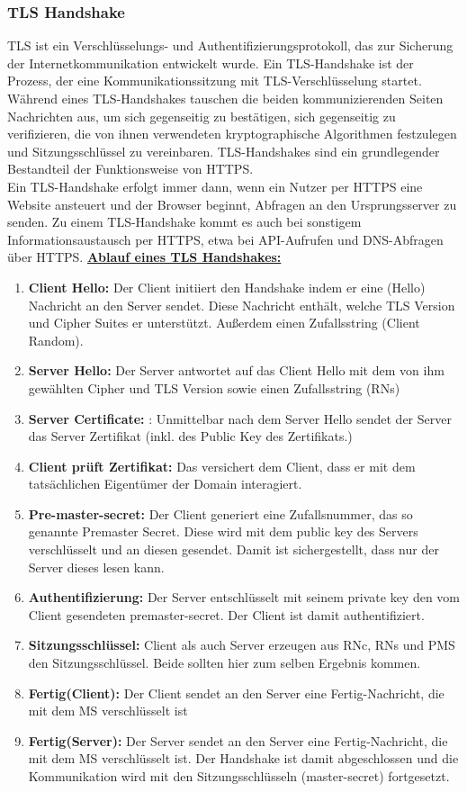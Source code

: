 \documentclass[12pt,a4paper]{article}
\begin{document}
\subsubsection{TLS Handshake}
TLS ist ein Verschlüsselungs- und Authentifizierungsprotokoll, das zur Sicherung der Internetkommunikation entwickelt wurde. Ein TLS-Handshake ist der Prozess, der eine Kommunikationssitzung mit TLS-Verschlüsselung startet. Während eines TLS-Handshakes tauschen die beiden kommunizierenden Seiten Nachrichten aus, um sich gegenseitig zu bestätigen, sich gegenseitig zu verifizieren, die von ihnen verwendeten kryptographische Algorithmen festzulegen und Sitzungsschlüssel zu vereinbaren. TLS-Handshakes sind ein grundlegender Bestandteil der Funktionsweise von HTTPS.\\
Ein TLS-Handshake erfolgt immer dann, wenn ein Nutzer per HTTPS eine Website ansteuert und der Browser beginnt, Abfragen an den Ursprungsserver zu senden. Zu einem TLS-Handshake kommt es auch bei sonstigem Informationsaustausch per HTTPS, etwa bei API-Aufrufen und DNS-Abfragen über HTTPS.\newpage
\textbf{\underline{Ablauf eines TLS Handshakes:}}
\begin{enumerate}
	\item \textbf{Client Hello:}  Der Client initiiert den Handshake indem er eine (Hello) Nachricht an den Server sendet. Diese Nachricht enthält, welche TLS Version und Cipher Suites er unterstützt. Außerdem einen Zufallsstring (Client Random).
	\item \textbf{Server Hello:} Der Server antwortet auf das Client Hello mit dem von ihm gewählten Cipher und TLS Version sowie einen Zufallsstring (RNs)
	\item \textbf{Server Certificate:} : Unmittelbar nach dem Server Hello sendet der Server das Server Zertifikat (inkl. des Public Key des Zertifikats.)
	\item \textbf{Client prüft Zertifikat:} Das versichert dem Client, dass er mit dem tatsächlichen Eigentümer der Domain interagiert.
	\item \textbf{Pre-master-secret:} Der Client generiert eine Zufallsnummer, das so genannte Premaster Secret. Diese wird mit dem public key des Servers verschlüsselt und an diesen gesendet. Damit ist sichergestellt, dass nur der Server dieses lesen kann.
	\item \textbf{Authentifizierung:} Der Server entschlüsselt mit seinem private key den vom Client gesendeten premaster-secret. Der Client ist damit authentifiziert.
	\item \textbf{Sitzungsschlüssel:} Client als auch Server erzeugen aus RNc, RNs und PMS den Sitzungsschlüssel. Beide sollten hier zum selben Ergebnis kommen.
	\item \textbf{Fertig(Client):} Der Client sendet an den Server eine Fertig-Nachricht, die mit dem MS verschlüsselt ist
	\item \textbf{Fertig(Server):} Der Server sendet an den Server eine Fertig-Nachricht, die mit dem MS verschlüsselt ist. Der Handshake ist damit abgeschlossen und die Kommunikation wird mit den Sitzungsschlüsseln (master-secret) fortgesetzt.
\end{enumerate}
\end{document}
